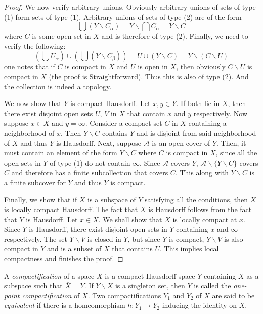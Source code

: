 \begin{proof}
    We now verify arbitrary unions. Obviously arbitrary unions of sets of type (1) form sets of type (1). Arbitrary unions of sets of type (2) are of the form 
    \begin{equation*}
        \bigcup\left(Y\backslash C_\alpha\right) = Y\backslash\bigcap C_\alpha = Y\backslash C
    \end{equation*}
    where $C$ is some open set in $X$ and is therefore of type (2). Finally, we need to verify the following:
    \begin{equation*}
        \left(\bigcup U_\alpha\right)\cup\left(\bigcup\left(Y\backslash C_\beta\right)\right) = U\cup\left(Y\backslash C\right) = Y\backslash(C\backslash U)
    \end{equation*}
    one notes that if $C$ is compact in $X$ and $U$ is open in $X$, then obviously $C\backslash U$ is compact in $X$ (the proof is Straightforward). Thus this is also of type (2). And the collection is indeed a topology.

    We now show that $Y$ is compact Hausdorff. Let $x,y\in Y$. If both lie in $X$, then there exist disjoint open sets $U$, $V$ in $X$ that contain $x$ and $y$ respectively. Now suppose $x\in X$ and $y =\infty$. Consider a compact set $C$ in $X$ containing a neighborhood of $x$. Then $Y\backslash C$ contains $Y$ and is disjoint from said neighborhood of $X$ and thus $Y$ is Hausdorff. Next, suppose $\mathscr{A}$ is an open cover of $Y$. Then, it must contain an element of the form $Y\backslash C$ where $C$ is compact in $X$, since all the open sets in $Y$ of type (1) do not contain $\infty$. Since $\mathscr{A}$ covers $Y$, $\mathscr{A}\backslash\{Y\backslash C\}$ covers $C$ and therefore has a finite subcollection that covers $C$. This along with $Y\backslash C$ is a finite subcover for $Y$ and thus $Y$ is compact.
    
    Finally, we show that if $X$ is a subspace of $Y$ satisfying all the conditions, then $X$ is locally compact Hausdorff. The fact that $X$ is Hausdorff follows from the fact that $Y$ is Hausdorff. Let $x\in X$. We shall show that $X$ is locally compact at $x$. Since $Y$ is Hausdorff, there exist disjoint open sets in $Y$ containing $x$ and $\infty$ respectively. The set $Y\backslash V$ is closed in $Y$, but since $Y$ is compact, $Y\backslash V$ is also compact in $Y$ and is a subset of $X$ that contains $U$. This implies local compactness and finishes the proof.
\end{proof}

\begin{definition}[Compactification]
    A \textit{compactification} of a space $X$ is a compact Hausdorff space $Y$ containing $X$ as a subspace such that $\overline{X} = Y$. If $Y\backslash X$ is a singleton set, then $Y$ is called the \textit{one-point compactification} of $X$. Two compactifications $Y_1$ and $Y_2$ of $X$ are said to be \textit{equivalent} if there is a homeomorphism $h: Y_1\to Y_2$ inducing the identity on $X$.
\end{definition}

